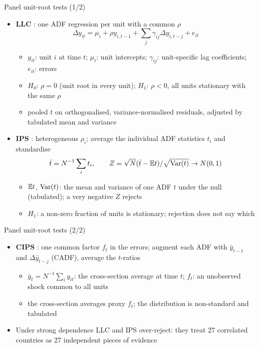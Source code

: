 \begin{frame}{Panel unit-root tests (1/2)}
\itemsize{\small}
\begin{itemize}
    \item \textbf{LLC} : one ADF regression per unit with a common $\rho$ \[ \Delta y_{it} = \mu_i + \rho y_{i,t-1} + \sum_j\gamma_{ij}\Delta y_{i,t-j} + e_{it} \]
    \begin{itemize}
        \item $y_{it}$: unit $i$ at time $t$; $\mu_i$: unit intercepts; $\gamma_{ij}$: unit-specific lag coefficients; $e_{it}$: errors
        \item $H_0$: $\rho = 0$ (unit root in every unit); $H_1$: $\rho < 0$, all units stationary with the same $\rho$
        \item pooled $t$ on orthogonalised, variance-normalised residuals, adjusted by tabulated mean and variance
    \end{itemize}
    \item \textbf{IPS} : heterogeneous $\rho_i$; average the individual ADF statistics $t_i$ and standardise \[ \bar t = N^{-1}\sum_i t_i, \qquad Z = \sqrt N(\bar t - \mathbb{E} t)/\sqrt{\text{Var}(t)} \to N(0, 1) \]
    \begin{itemize}
        \item $\mathbb{E} t$, $\text{Var}(t)$: the mean and variance of one ADF $t$ under the null (tabulated); a very negative $Z$ rejects
        \item $H_1$: a non-zero fraction of units is stationary; rejection does not say which
    \end{itemize}
\end{itemize}
\end{frame}

\begin{frame}{Panel unit-root tests (2/2)}
\itemsize{\small}
\begin{itemize}
    \item \textbf{CIPS} : one common factor $f_t$ in the errors; augment each ADF with $\bar y_{t-1}$ and $\Delta\bar y_{t-j}$ (CADF), average the $t$-ratios
    \begin{itemize}
        \item $\bar y_t = N^{-1}\sum_i y_{it}$: the cross-section average at time $t$; $f_t$: an unobserved shock common to all units
        \item the cross-section averages proxy $f_t$; the distribution is non-standard and tabulated
    \end{itemize}
    \item Under strong dependence LLC and IPS over-reject: they treat 27 correlated countries as 27 independent pieces of evidence
\end{itemize}
\end{frame}

